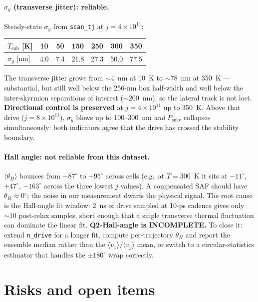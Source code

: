\documentclass[11pt,a4paper]{article}
\begin{document}
\paragraph{$\sigma_y$ (transverse jitter): reliable.} Steady-state
$\sigma_y$ from \texttt{scan\_tj} at $j = 4 \times 10^{11}$:

\begin{table}[h]
\centering
\begin{tabular}{lcccccc}
\toprule
$T_\mathrm{sub}$ [K] & 10 & 50 & 150 & 250 & 300 & 350 \\
\midrule
$\sigma_y$ [nm] & 4.0 & 7.4 & 21.8 & 27.3 & 50.0 & 77.5 \\
\bottomrule
\end{tabular}
\end{table}

The transverse jitter grows from $\sim 4$~nm at 10~K to $\sim 78$~nm
at 350~K — substantial, but still well below the 256-nm box
half-width and well below the inter-skyrmion separations of interest
($\sim 200$~nm), so the lateral track is not lost.
\textbf{Directional control is preserved} at $j = 4 \times 10^{11}$
up to 350~K. Above that drive ($j = 8 \times 10^{11}$), $\sigma_y$
blows up to 100--300~nm \emph{and} $P_\mathrm{surv}$ collapses
simultaneously: both indicators agree that the drive has crossed
the stability boundary.

\paragraph{Hall angle: not reliable from this dataset.}
$\langle \theta_H \rangle$ bounces from $-87^\circ$ to $+95^\circ$
across cells (e.g.\ at $T = 300$~K it sits at $-11^\circ$,
$+47^\circ$, $-163^\circ$ across the three lowest $j$ values). A
compensated SAF should have $\theta_H \approx 0^\circ$; the noise
in our measurement dwarfs the physical signal. The root cause is
the Hall-angle fit window: 2~ns of drive sampled at 10-ps cadence
gives only $\sim 10$ post-relax samples, short enough that a
single transverse thermal fluctuation can dominate the linear fit.
\textbf{Q2-Hall-angle is INCOMPLETE.} To close it: extend
\texttt{n\_drive} for a longer fit, compute per-trajectory
$\theta_H$ and report the ensemble median rather than the
$\langle v_x \rangle / \langle v_y \rangle$ mean, or switch to a
circular-statistics estimator that handles the $\pm 180^\circ$
wrap correctly.

\section{Risks and open items}\label{sec:risks}
\end{document}

